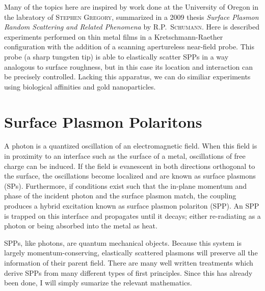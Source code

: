 \documentclass[a4paper,titlepage,onecolumn]{report}
\newcommand{\name}[1]{\textsc{#1}}
\begin{document}
Many of the topics here are inspired by work done at the University of
Oregon in the labratory of \name{Stephen Gregory}, summarized in
a 2009 thesis \textit{Surface Plasmon Random Scattering and Related
Phenomena} \cite{schumann2009surface} by \name{R\@.P.\@~Schumann}.
Here is described experiments performed on thin metal films in a
Kretschmann-Raether configuration with the addition of a scanning
apertureless near-field probe.  This probe (a sharp tungsten tip) is able
to elastically scatter SPPs in a way analogous to surface roughness, but in
this case its location and interaction can be precisely controlled.
Lacking this apparatus, we can do similiar experiments using biological
affinities and gold nanoparticles.

\section{Surface Plasmon Polaritons}
A photon is a quantized oscillation of an electromagnetic field.  When this
field is in proximity to an interface such as the surface of a metal,
oscillations of free charge can be induced.  If the field is evanescent in
both directions orthogonal to the surface, the oscillations become
localized and are known as surface plasmons (SPs).  Furthermore, if
conditions exist such that the in-plane momentum and phase of the incident
photon and the surface plasmon match, the coupling produces a hybrid
excitation known as surface plasmon polariton (SPP).  An SPP is trapped on
this interface and propagates until it decays; either re-radiating as a
photon or being absorbed into the metal as heat.

SPPs, like photons, are quantum mechanical objects.  Because this system is
largely momentum-conserving, elastically scattered plasmons will preserve
all the information of their parent field.  There are many well written
treatments which derive SPPs from many different types of first principles.
Since this has already been done, I will simply sumarize the relevant
mathematics.
\end{document}
